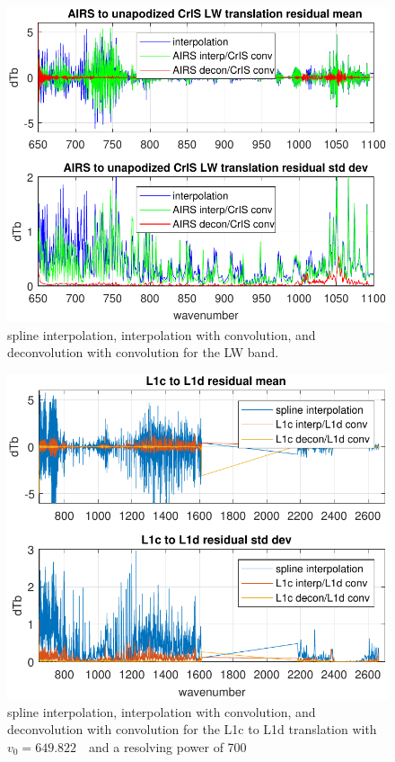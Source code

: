 \documentclass[journal]{IEEEtran}
\begin{document}
\begin{figure} %
  \centering
  \includegraphics[width=\linewidth]{figures/a2cris_interp_LW.pdf}
  \caption{spline interpolation, interpolation with convolution, 
    and deconvolution with convolution for the {\cris} LW band.}
  \label{intpLW}
\end{figure}

\begin{figure} %
  \centering
  \includegraphics[width=\linewidth]{figures/CtoD_interp_diff.pdf}
  \caption{spline interpolation, interpolation with convolution, 
    and deconvolution with convolution for the {\airs} L1c to L1d
    translation with $v_0=649.822$~\wn\ and a resolving power of 700}
  \label{interpL1d}
\end{figure}
\end{document}
